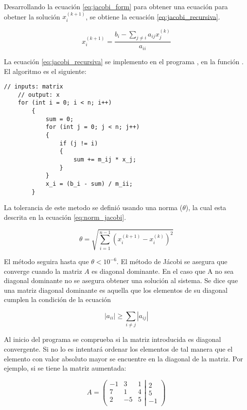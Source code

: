 Desarrollando la ecuación \ref{eq:jacobi_form} para obtener una ecuación para obetner la solución $x_i^{(k+1)}$, se obtiene la ecuación \ref{eq:jacobi_recursiva}.

\begin{equation}
    x_i^{(k+1)} = \frac{b_i - \sum\limits_{j\neq i} a_{ij}x_{j}^{(k)}}{a_{ii}} \label{eq:jacobi_recursiva}
\end{equation}

La ecuación \ref{eq:jacobi_recursiva} se implemento en el programa , en la función . El algoritmo es el siguiente:

\begin{lstlisting}[style=CStyle]
    // inputs: matrix
    // output: x
    for (int i = 0; i < n; i++)
        {
            sum = 0;
            for (int j = 0; j < n; j++)
            {
                if (j != i)
                {
                    sum += m_ij * x_j;
                }
            }
            x_i = (b_i - sum) / m_ii;
        }
\end{lstlisting}

La tolerancia de este metodo se definió usando una norma ($\theta$), la cual esta descrita en la ecuación \ref{eq:norm_jacobi}.

\begin{equation}
    \theta =\sqrt{\sum_{i=1}^{n-1} (x_i^{(k+1)}-x_i^{(k)})^2} \label{eq:norm_jacobi}
\end{equation}

El método seguira hasta que $\theta < 10^{-6}$. El método de Jácobi se asegura que converge cuando la matriz $A$ es diagonal dominante. En el caso que A no sea diagonal dominante no se asegura obtener una solución al sistema. Se dice que una matriz diagonal dominante es aquella que los elementos de su diagonal cumplen la condición de la ecuación

\begin{equation}
    |a_{ii}| \geq \sum_{i\neq j} |a_{ij}|
\end{equation}


Al inicio del programa se comprueba si la matriz introducida es diagonal convergente. Si no lo es intentará ordenar los elementos de tal manera que el elemento con valor absoluto mayor se encuentre en la diagonal de la matriz. Por ejemplo, si se tiene la matriz aumentada:

\begin{equation*}
    A = \left(\left.
    \begin{matrix}
        -1 & 3  & 1 \\
        7  & 1  & 4 \\
        2  & -5 & 5 \\
    \end{matrix}
    \right|
    \begin{matrix}
        2 \\
        5 \\
        -1
    \end{matrix}
    \right)
\end{equation*}

